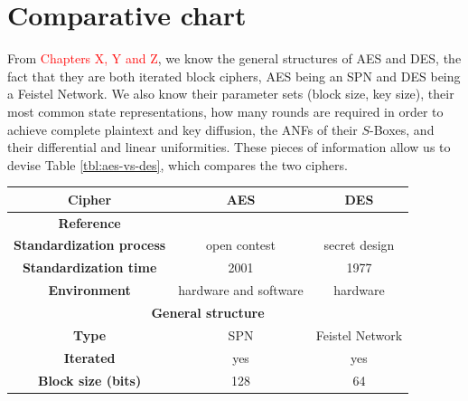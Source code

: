 \documentclass{report}
\begin{document}
\section{Comparative chart}

From \textcolor{red}{Chapters X, Y and Z}, we know the general structures of AES and DES, the fact that they are both iterated block ciphers, AES being an SPN and DES being a Feistel Network. We also know their parameter sets (block size, key size), their most common state representations, how many rounds are required in order to achieve complete plaintext and key diffusion, the ANFs of their $S$-Boxes, and their differential and linear uniformities. These pieces of information allow us to devise Table \ref{tbl:aes-vs-des}, which compares the two ciphers.

\begin{longtable}[c]{|ccc|}
\hline
\multicolumn{1}{|c|}{\textbf{Cipher}}                                & \multicolumn{1}{c|}{\textbf{AES}}               & \textbf{DES}             \\ \hline
\endfirsthead
%
\endhead
%
\multicolumn{1}{|c|}{\textbf{Reference}}                             & \multicolumn{1}{c|}{\cite{AES-FIPS}}                          & \cite{DES-FIPS}                        \\ \hline
\multicolumn{1}{|c|}{\textbf{Standardization process}}               & \multicolumn{1}{c|}{open contest}               & secret design            \\ \hline
\multicolumn{1}{|c|}{\textbf{Standardization time}}                  & \multicolumn{1}{c|}{2001}                       & 1977                     \\ \hline
\multicolumn{1}{|c|}{\textbf{Environment}}                           & \multicolumn{1}{c|}{hardware and software}      & hardware                 \\ \hline
\multicolumn{3}{|c|}{\textbf{General structure}}                                                                                                  \\ \hline
\multicolumn{1}{|c|}{\textbf{Type}}                                  & \multicolumn{1}{c|}{SPN}                        & Feistel Network          \\ \hline
\multicolumn{1}{|c|}{\textbf{Iterated}}                              & \multicolumn{1}{c|}{yes}                        & yes                      \\ \hline
\multicolumn{1}{|c|}{\textbf{Block size (bits)}}                     & \multicolumn{1}{c|}{128}                        & 64                       \\ \hline

\end{longtable}
\end{document}
